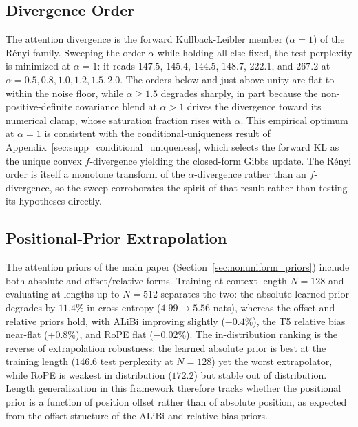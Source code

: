 \documentclass[twoside,11pt]{article}
\begin{document}
\subsection{Divergence Order}
The attention divergence is the forward Kullback-Leibler member ($\alpha = 1$) of the Rényi family. Sweeping the order $\alpha$ while holding all else fixed, the test perplexity is minimized at $\alpha = 1$: it reads $147.5$, $145.4$, $144.5$, $148.7$, $222.1$, and $267.2$ at $\alpha = 0.5, 0.8, 1.0, 1.2, 1.5, 2.0$. The orders below and just above unity are flat to within the noise floor, while $\alpha \geq 1.5$ degrades sharply, in part because the non-positive-definite covariance blend at $\alpha > 1$ drives the divergence toward its numerical clamp, whose saturation fraction rises with $\alpha$. This empirical optimum at $\alpha = 1$ is consistent with the conditional-uniqueness result of Appendix~\ref{sec:supp_conditional_uniqueness}, which selects the forward KL as the unique convex $f$-divergence yielding the closed-form Gibbs update. The Rényi order is itself a monotone transform of the $\alpha$-divergence rather than an $f$-divergence, so the sweep corroborates the spirit of that result rather than testing its hypotheses directly.

\subsection{Positional-Prior Extrapolation}
The attention priors of the main paper (Section~\ref{sec:nonuniform_priors}) include both absolute and offset/relative forms. Training at context length $N = 128$ and evaluating at lengths up to $N = 512$ separates the two: the absolute learned prior degrades by $11.4\%$ in cross-entropy ($4.99 \to 5.56$ nats), whereas the offset and relative priors hold, with ALiBi improving slightly ($-0.4\%$), the T5 relative bias near-flat ($+0.8\%$), and RoPE flat ($-0.02\%$). The in-distribution ranking is the reverse of extrapolation robustness: the learned absolute prior is best at the training length ($146.6$ test perplexity at $N = 128$) yet the worst extrapolator, while RoPE is weakest in distribution ($172.2$) but stable out of distribution. Length generalization in this framework therefore tracks whether the positional prior is a function of position offset rather than of absolute position, as expected from the offset structure of the ALiBi and relative-bias priors.



\end{document}
